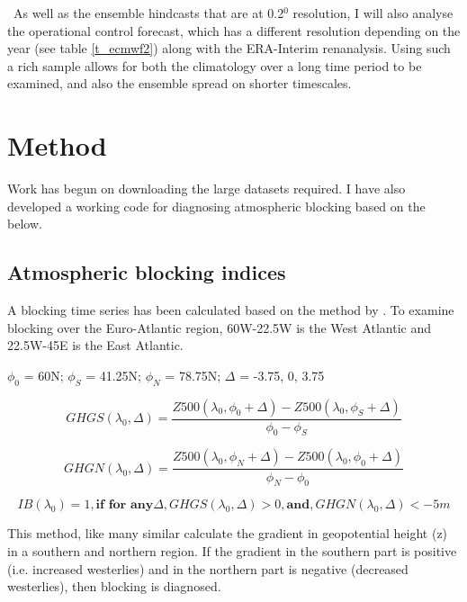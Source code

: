 \
As well as the ensemble hindcasts that are at 0.2$^0$ resolution, I will also analyse the operational control forecast, which has a different resolution depending on the year (see table \ref{t_ecmwf2}) along with the ERA-Interim renanalysis.
Using such a rich sample allows for both the climatology over a long time period to be examined, and also 
the ensemble spread on shorter timescales.


\section{Method}
Work has begun on downloading the large datasets required. I have also developed a working code for diagnosing atmospheric blocking based on the below.


\subsection{Atmospheric blocking indices}

A blocking time series has been calculated based on the method by \cite{davini2016northern}. To examine blocking over the Euro-Atlantic region, 60W-22.5W is the West Atlantic and 22.5W-45E is the East Atlantic.

$\phi_{0}$ = 60N; $\phi_{S}$ = 41.25N; $\phi_{N}$ = 78.75N; $\Delta$ = -3.75, 0, 3.75

\begin{equation} \label{eqblock1} %
GHGS(\lambda_{0}, \Delta) = \frac{Z500(\lambda_{0}, \phi_{0}+ \Delta) - Z500(\lambda_{0}, \phi_{S}+ \Delta)}
{\phi_{0} - \phi_{S}}
\end{equation}

\begin{equation} \label{eqblock2}
GHGN(\lambda_{0}, \Delta) = \frac{Z500(\lambda_{0}, \phi_{N}+ \Delta) - Z500(\lambda_{0}, \phi_{0}+ \Delta)}
{\phi_{N} - \phi_{0}}
\end{equation}


\begin{equation} \label{eqblock3}
IB(\lambda_{0}) = 1,   \textbf{if for any} \Delta ,  GHGS(\lambda_{0}, \Delta) > 0  , \textbf{and},   GHGN(\lambda_{0}, \Delta) < -5 m 
\end{equation}


This method, like many similar calculate the gradient in geopotential height (z) in a southern and northern region. If the gradient in the southern part is positive (i.e. increased westerlies) and in the northern part is negative (decreased westerlies), then blocking is diagnosed.

